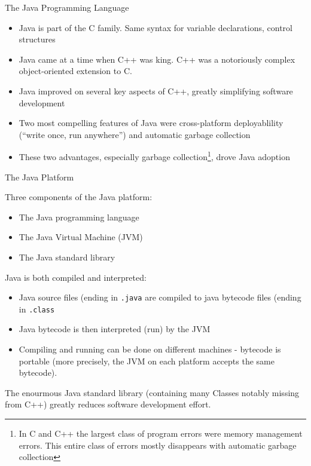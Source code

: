 \documentclass{beamer}
\begin{document}
\begin{frame}[fragile]{The Java Programming Language}


\begin{itemize}
\item Java is part of the C family.  Same syntax for variable
  declarations, control structures
\item Java came at a time when C++ was king.  C++ was a notoriously complex
  object-oriented extension to C.
\item Java improved on several key aspects of C++, greatly simplifying
  software development
\item Two most compelling features of Java were cross-platform
  deployablility (``write once, run anywhere'') and automatic garbage
  collection
\item These two advantages, especially garbage collection\footnote{In
    C and C++ the largest class of program errors were memory
    management errors.  This entire class of errors mostly disappears
    with automatic garbage collection}, drove Java adoption
\end{itemize}

\end{frame}

\begin{frame}[fragile]{The Java Platform}


Three components of the Java platform:
\begin{itemize}
\item The Java programming language
\item The Java Virtual Machine (JVM)
\item The Java standard library
\end{itemize}
Java is both compiled and interpreted:
\begin{itemize}
\item Java source files (ending in {\tt .java} are compiled to java
  bytecode files (ending in {\tt .class}
\item Java bytecode is then interpreted (run) by the JVM
\item Compiling and running can be done on different machines -
  bytecode is portable (more precisely, the JVM on each platform
  accepts the same bytecode).
\end{itemize}
The enourmous Java standard library (containing many Classes notably
missing from C++) greatly reduces software development effort.
\end{frame}
\end{document}
